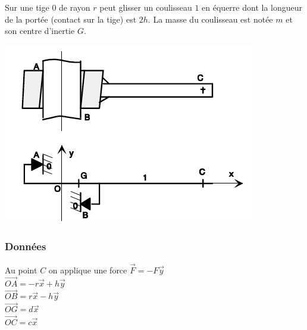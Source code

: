 %
%


Sur une tige $0$ de rayon $r$ peut glisser un coulisseau $1$ en équerre dont la longueur de la portée (contact sur la tige) est $2h$. La masse du coulisseau est notée $m$ et son centre d'inertie $G$.

\begin{center}
\includegraphics[scale=0.5]{png/arcbout.png}
\end{center}

\subsubsection{Données}
Au point $C$ on applique une force $\overrightarrow{F}=-F\overrightarrow{y}$\\
$\overrightarrow{OA}=-r\overrightarrow{x}+h\overrightarrow{y}$\\
$\overrightarrow{OB}=r\overrightarrow{x}-h\overrightarrow{y}$\\
$\overrightarrow{OG}=d\overrightarrow{x}$\\
$\overrightarrow{OC}=c\overrightarrow{x}$

